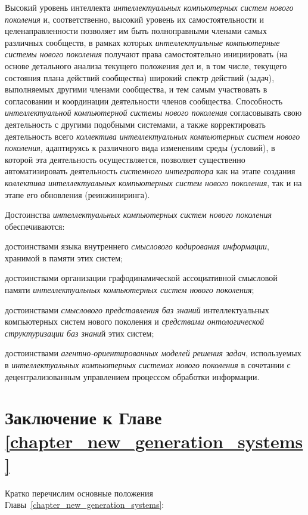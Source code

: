 Высокий уровень интеллекта \textit{интеллектуальных компьютерных систем нового поколения} и, соответственно, высокий уровень их самостоятельности и целенаправленности позволяет им быть полноправными членами самых различных сообществ, в рамках которых \textit{интеллектуальные компьютерные системы нового поколения} получают права самостоятельно инициировать (на основе детального анализа текущего положения дел и, в том числе, текущего состояния плана действий сообщества) широкий спектр действий (задач), выполняемых другими членами сообщества, и тем самым участвовать в согласовании и координации деятельности членов сообщества. Способность \textit{интеллектуальной компьютерной системы нового поколения} согласовывать свою деятельность с другими подобными системами, а также корректировать деятельность всего \textit{коллектива интеллектуальных компьютерных систем нового поколения,} адаптируясь к различного вида изменениям среды (условий), в которой эта деятельность осуществляется, позволяет существенно автоматизировать деятельность \textit{системного интегратора} как на этапе создания \textit{коллектива интеллектуальных компьютерных систем нового поколения}, так и на этапе его обновления (реинжиниринга).

Достоинства \textit{интеллектуальных компьютерных систем нового поколения} обеспечиваются:

\begin{textitemize}
	\item достоинствами языка внутреннего \textit{смыслового кодирования информации}, хранимой в памяти этих систем;
	\item достоинствами организации графодинамической ассоциативной смысловой памяти \textit{интеллектуальных компьютерных систем нового поколения};
	\item достоинствами \textit{смыслового представления баз знаний} интеллектуальных компьютерных систем нового поколения и \textit{средствами онтологической структуризации баз знани}й этих систем;
	\item достоинствами \textit{агентно-ориентированных моделей решения задач}, используемых в \textit{интеллектуальных компьютерных системах нового поколения} в сочетании с децентрализованным управлением процессом обработки информации.
\end{textitemize}

\section*{Заключение к Главе \ref{chapter_new_generation_systems}}
Кратко перечислим основные положения Главы~\ref{chapter_new_generation_systems}:

